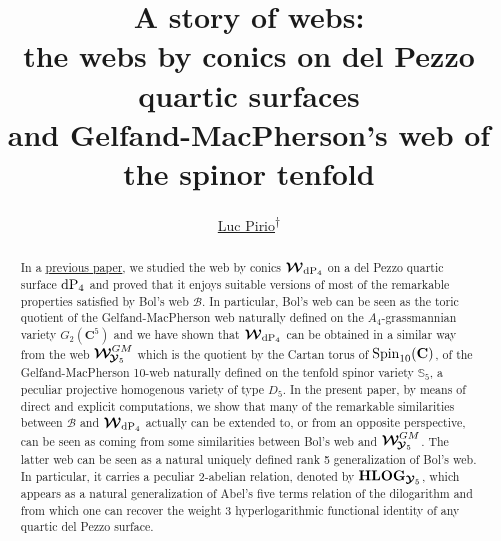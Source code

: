 \documentclass[11pt]{amsart}
\author[L. Pirio]{\href{mailto:luc.pirio@uvsq.fr}{Luc Pirio}\textsuperscript{$\dagger$}}
\title[A story of webs]
 {A story of webs: \\ the webs by conics on del Pezzo quartic surfaces \\
 and  Gelfand-MacPherson's web of the spinor tenfold}
\begin{document}
\maketitle




\begin{abstract}
 In a \href{https://arxiv.org/abs/2401.06711}{previous paper},  we studied the web by conics  %
$\boldsymbol{\mathcal W}_{{\rm dP}_4}$ on a del Pezzo quartic surface ${\rm dP}_4$ and proved that it enjoys suitable versions of most of the remarkable properties
satisfied by  Bol's web $\boldsymbol{\mathcal B}$.  
 In particular, Bol's web can be seen as the toric quotient of the Gelfand-MacPherson web naturally defined on the $A_4$-grassmannian variety $G_2(\mathbf C^5)$ and  we have
shown  that $\boldsymbol{\mathcal W}_{{\rm dP}_4}$ can be obtained in a  similar way from the 
web $\boldsymbol{\mathcal W}^{GM}_{ \hspace{-0.05cm} \boldsymbol{\mathcal Y}_5}$ which is the quotient  by the Cartan torus of ${\rm Spin}_{10}(\mathbf C)$, of the Gelfand-MacPherson 10-web naturally defined on the tenfold spinor variety $\mathbb S_5$,   a peculiar projective homogenous variety of type $D_5$.
%
%
 In the present paper, by means of direct and explicit computations,  we show that many of the 
remarkable similarities between 
$\boldsymbol{\mathcal B}$ and $\boldsymbol{\mathcal W}_{{\rm dP}_4}$ actually can be extended to, or from an opposite perspective, can be seen as coming from some 
 similarities between Bol's web and 
$\boldsymbol{\mathcal W}^{GM}_{ \hspace{-0.05cm} \boldsymbol{\mathcal Y}_5}$.  The latter web can be seen as a natural uniquely defined rank 5 generalization of Bol's web. In particular, it carries a  peculiar 2-abelian relation, denoted by 
${\bf HLOG}_{ \boldsymbol{\mathcal Y}_5}$, 
which appears as a natural generalization of Abel's five terms relation of the dilogarithm 
and from which one can recover  the weight 3 hyperlogarithmic functional identity of any   quartic del Pezzo surface.
\end{abstract}%
\end{document}
